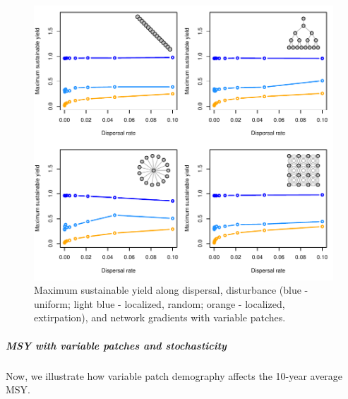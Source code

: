\documentclass[]{article}
\let\oldsubparagraph\subparagraph
\renewcommand{\subparagraph}[1]{\oldsubparagraph{#1}\mbox{}}
\begin{document}
\begin{figure}[H]

{\centering \includegraphics{Managing_for_ecological_surprises_in_metapopulations_makeHTML_files/figure-latex/MSY with variable patches-1} 

}

\caption{Maximum sustainable yield along dispersal, disturbance (blue - uniform; light blue - localized, random; orange - localized, extirpation), and network gradients with variable patches.}\label{fig:MSY with variable patches}
\end{figure}

\hypertarget{msy-with-variable-patches-and-stochasticity}{%
\subparagraph{MSY with variable patches and
stochasticity}\label{msy-with-variable-patches-and-stochasticity}}

Now, we illustrate how variable patch demography affects the 10-year
average MSY.
\end{document}
